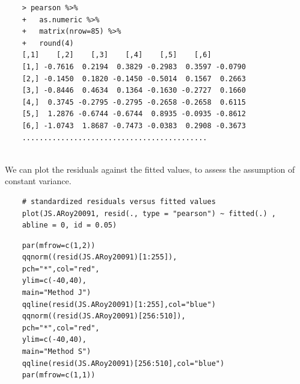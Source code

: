 \documentclass[a4paper,12pt]{article}
\begin{document}
\begin{framed}
	\begin{verbatim}
	> pearson %>%
	+   as.numeric %>% 
	+   matrix(nrow=85) %>%
	+   round(4) 
	[,1]    [,2]    [,3]    [,4]    [,5]    [,6]
	[1,] -0.7616  0.2194  0.3829 -0.2983  0.3597 -0.0790
	[2,] -0.1450  0.1820 -0.1450 -0.5014  0.1567  0.2663
	[3,] -0.8446  0.4634  0.1364 -0.1630 -0.2727  0.1660
	[4,]  0.3745 -0.2795 -0.2795 -0.2658 -0.2658  0.6115
	[5,]  1.2876 -0.6744 -0.6744  0.8935 -0.0935 -0.8612
	[6,] -1.0743  1.8687 -0.7473 -0.0383  0.2908 -0.3673
	...........................................
	
	\end{verbatim}
\end{framed}

We can plot the residuals against the fitted values, to assess the assumption of constant variance. 
\begin{framed}
	\begin{verbatim}
	# standardized residuals versus fitted values 
	plot(JS.ARoy20091, resid(., type = "pearson") ~ fitted(.) , 
	abline = 0, id = 0.05)
	\end{verbatim}
\end{framed}


\begin{framed}
	\begin{verbatim}
	par(mfrow=c(1,2))
	qqnorm((resid(JS.ARoy20091)[1:255]),
	pch="*",col="red",
	ylim=c(-40,40),
	main="Method J")
	qqline(resid(JS.ARoy20091)[1:255],col="blue")
	qqnorm((resid(JS.ARoy20091)[256:510]),
	pch="*",col="red",
	ylim=c(-40,40),
	main="Method S")
	qqline(resid(JS.ARoy20091)[256:510],col="blue")
	par(mfrow=c(1,1))
	\end{verbatim}	
\end{framed}
\end{document}
